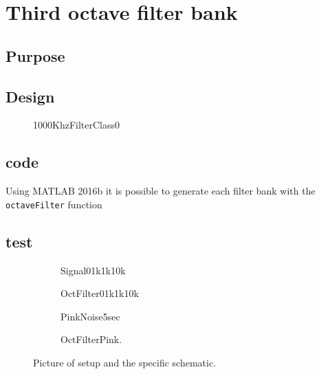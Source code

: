 \section{Third octave filter bank} {\label{sec:OctaveBank}}


\subsection{Purpose}


\subsection{Design}

\begin{figure}[H]
	\centering
	
	\caption{1000KhzFilterClass0}
	\label{fig:1000KhzFilterClass0}
\end{figure}

\subsection{code}

Using MATLAB 2016b it is possible to generate each filter bank with the \verb|octaveFilter| function


\subsection{test}

\begin{figure}[H]
	\centering
	\begin{subfigure}[b]{0.45\textwidth}
		\centering
			
		\caption{Signal01k1k10k}
		\label{fig:Signal01k1k10k}
	\end{subfigure}
	\hfill
	\begin{subfigure}[b]{0.45\textwidth}
		\centering
			
		\caption{OctFilter01k1k10k}
		\label{fig:OctFilter01k1k10k}
	\end{subfigure}	
	\begin{subfigure}[b]{0.45\textwidth}
		\centering
			
		\caption{PinkNoise5sec}
		\label{fig:PinkNoise5sec}
	\end{subfigure}	
	\hfill
	\begin{subfigure}[b]{0.45\textwidth}
		\centering
		
		\caption{OctFilterPink.}
		\label{fig:OctFilterPink}
	\end{subfigure}	

	\caption{Picture of setup and the specific schematic.}
\end{figure}




